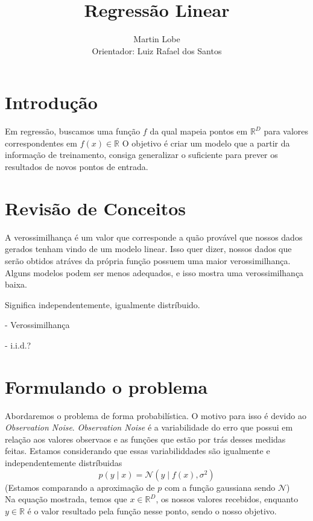 \documentclass[a4paper, 12pt]{scrartcl}
\title{Regressão Linear}
\author{Martin Lobe \\ Orientador: Luiz Rafael dos Santos}
\date{}
\theoremstyle{plain}%
\theoremstyle{definition}
\theoremstyle{remark}
\def \Real {\mathds{R}}
\begin{document}
\onehalfspacing
\maketitle
 
\section*{Introdução}

Em regressão, buscamos uma função $f$ da qual mapeia pontos em $\Real^D$ para valores correspondentes em $f(x) \in \Real$
O objetivo é criar um modelo que a partir da informação de treinamento, consiga generalizar o suficiente para prever os resultados de novos pontos de entrada.

\section{Revisão de Conceitos}

\begin{definition}[Verossimilhança]
    A verossimilhança é um valor que corresponde a quão provável que nossos dados gerados tenham vindo de um modelo linear. 
    Isso quer dizer, nossos dados que serão obtidos atráves da própria função possuem uma maior verossimilhança. Alguns modelos podem ser menos adequados, e isso mostra uma verossimilhança baixa.
\end{definition}

\begin{definition}[I.I.D]
    Significa independentemente, igualmente distríbuido.
\end{definition}

- Verossimilhança

- i.i.d.?




\section{Formulando o problema}
Abordaremos o problema de forma probabilística. O motivo para isso é devido ao \textit{Observation Noise}.
\textit{Observation Noise} é a variabilidade do erro que possui em relação aos valores observaos e as funções que estão por trás desses medidas feitas. 
Estamos considerando que essas variabiliddades são igualmente e independentemente distríbuidas
\[
    p(y\mid x) = \mathcal{N}(y\mid f(x), \sigma^2)
\]
(Estamos comparando a aproximação de $p$ com a função gaussiana sendo $\mathcal{N}$)
\\
Na equação mostrada, temos que $x \in \Real^D$, os nossos valores recebidos, enquanto $y \in \Real$ é o valor resultado pela função nesse ponto, sendo o nosso objetivo.
\end{document}
